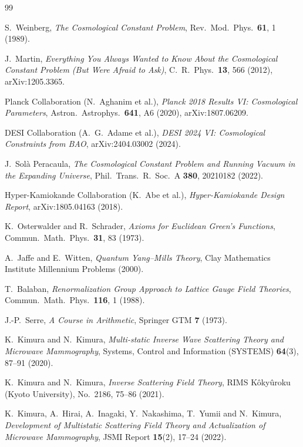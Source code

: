 \documentclass[12pt]{article}
\begin{document}
\newpage
\begin{thebibliography}{99}

S.~Weinberg,
\textit{The Cosmological Constant Problem},
Rev.\ Mod.\ Phys.\ \textbf{61}, 1 (1989).

J.~Martin,
\textit{Everything You Always Wanted to Know About the Cosmological
Constant Problem (But Were Afraid to Ask)},
C.\ R.\ Phys.\ \textbf{13}, 566 (2012),
arXiv:1205.3365.

Planck Collaboration (N.~Aghanim et al.),
\textit{Planck 2018 Results VI: Cosmological Parameters},
Astron.\ Astrophys.\ \textbf{641}, A6 (2020),
arXiv:1807.06209.

DESI Collaboration (A.~G.~Adame et al.),
\textit{DESI 2024 VI: Cosmological Constraints from BAO},
arXiv:2404.03002 (2024).

J.~Sol\`a Peracaula,
\textit{The Cosmological Constant Problem and Running Vacuum
in the Expanding Universe},
Phil.\ Trans.\ R.\ Soc.\ A \textbf{380}, 20210182 (2022).

Hyper-Kamiokande Collaboration (K.~Abe et al.),
\textit{Hyper-Kamiokande Design Report},
arXiv:1805.04163 (2018).

K.~Osterwalder and R.~Schrader,
\textit{Axioms for Euclidean Green's Functions},
Commun.\ Math.\ Phys.\ \textbf{31}, 83 (1973).

A.~Jaffe and E.~Witten,
\textit{Quantum Yang--Mills Theory},
Clay Mathematics Institute Millennium Problems (2000).

T.~Balaban,
\textit{Renormalization Group Approach to Lattice Gauge Field Theories},
Commun.\ Math.\ Phys.\ \textbf{116}, 1 (1988).

J.-P.~Serre,
\textit{A Course in Arithmetic},
Springer GTM \textbf{7} (1973).

K.~Kimura and N.~Kimura,
\textit{Multi-static Inverse Wave Scattering Theory
and Microwave Mammography},
Systems, Control and Information (SYSTEMS)
\textbf{64}(3), 87--91 (2020).

K.~Kimura and N.~Kimura,
\textit{Inverse Scattering Field Theory},
RIMS K\^{o}ky\^{u}roku (Kyoto University),
No.~2186, 75--86 (2021).

K.~Kimura, A.~Hirai, A.~Inagaki, Y.~Nakashima, T.~Yumii
and N.~Kimura,
\textit{Development of Multistatic Scattering Field Theory
and Actualization of Microwave Mammography},
JSMI Report \textbf{15}(2), 17--24 (2022).


\end{thebibliography}
\end{document}
